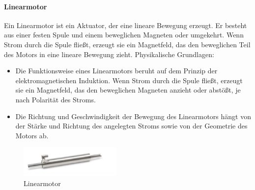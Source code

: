 \paragraph{Linearmotor}
Ein Linearmotor ist ein Aktuator, der eine lineare Bewegung erzeugt. Er besteht aus einer festen Spule und einem
beweglichen Magneten oder umgekehrt. Wenn Strom durch
die Spule fließt, erzeugt sie %
ein Magnetfeld, das den beweglichen Teil des Motors in eine lineare Bewegung zieht. \newline
Physikalische Grundlagen:
\begin{itemize}
	\item Die Funktionsweise eines Linearmotors beruht auf dem Prinzip der elektromagnetischen Induktion. Wenn Strom durch die
	Spule fließt, erzeugt sie ein Magnetfeld, das den beweglichen Magneten anzieht oder abstößt, je nach Polarität des Stroms.
	\item Die Richtung und Geschwindigkeit der Bewegung des Linearmotors hängt von der Stärke und Richtung des angelegten Stroms
	sowie von der Geometrie des Motors ab.
\end{itemize}
\begin{figure}[htbp]
	\centering
	\includegraphics[width=5cm]{img/Linearmotor}
	\caption{Linearmotor}
	\label{fig:Linearmotor}
\end{figure}

